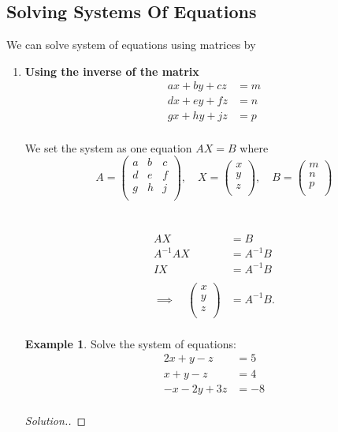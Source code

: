 \documentclass[11pt,a4paper]{article}
\theoremstyle{definition}
\newtheorem{example}[thm]{Example}
\newenvironment{solution}
  {\renewcommand{\qedsymbol}{}\begin{proof}[\textit{Solution}.]}
  {\end{proof}}
\begin{document}
\subsection{Solving Systems Of Equations}
We can solve system of equations using matrices by 
\begin{enumerate}
\item[(a).]\textbf{Using the inverse of the matrix}
\begin{align*}
ax +by + cz & = m\\
dx + ey + fz & = n\\
gx + hy + jz & =p\\
\end{align*}


We set the system as one equation $AX=B$ where $$A=
\begin{pmatrix}
a & b & c\\
d & e & f\\
g & h & j\\
\end{pmatrix}
,\quad  X=
\begin{pmatrix}
x\\ y\\ z\\
\end{pmatrix}
,\quad 
B=
\begin{pmatrix}
m\\n\\p\\
\end{pmatrix}
$$\\\\


\begin{align*}
AX &=B\\
A^{-1}AX &=A^{-1}B\\
IX & = A^{-1}B\\\\
\implies \quad  
\begin{pmatrix}
x\\ y\\ z\\
\end{pmatrix}
 & = A^{-1}B.\\
\end{align*}

\begin{example}

Solve the system of equations:
\begin{align*}
2x+y-z & =5\\
x + y -z & =4\\
-x-2y+3z & = -8\\
\end{align*}
\end{example}
\begin{solution}


\end{solution}
\end{enumerate}
\end{document}
